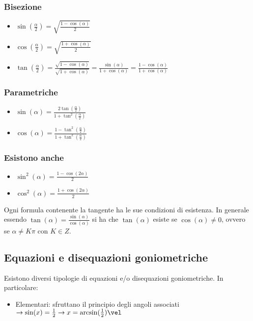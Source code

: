 \subsubsection*{Bisezione}

\begin{itemize}
    \item $\sin(\frac{\alpha}{2})=\sqrt{\frac{1-\cos(\alpha)}{2}}$
    \item $\cos(\frac{\alpha}{2})=\sqrt{\frac{1+\cos(\alpha)}{2}}$
    \item $\tan(\frac{\alpha}{2})=\frac{\sqrt{1-\cos(\alpha)}}{\sqrt{1+\cos(\alpha)}}=\frac{\sin(\alpha)}{1+\cos(\alpha)}=\frac{1-\cos(\alpha)}{1+\cos(\alpha)}$
\end{itemize}

\subsubsection*{Parametriche}

\begin{itemize}
    \item $\sin(\alpha)=\frac{2\tan(\frac{\alpha}{2})}{1+\tan^2(\frac{\alpha}{2})}$
    \item $\cos(\alpha)=\frac{1-\tan^2(\frac{\alpha}{2})}{1+\tan^2(\frac{\alpha}{2})}$
\end{itemize}

\subsubsection*{Esistono anche}

\begin{itemize}
    \item $\sin^2(\alpha)=\frac{1-\cos(2\alpha)}{2}$
    \item $\cos^2(\alpha)=\frac{1+\cos(2\alpha)}{2}$
\end{itemize}

Ogni formula contenente la tangente ha le sue condizioni di esistenza.
In generale essendo $\tan(\alpha)=\frac{\sin(\alpha)}{\cos(\alpha)}$ si ha che $\tan(\alpha)$ esiste se $\cos(\alpha)\neq0$, ovvero se $\alpha\neq K\pi$ con $K \in Z$.


\subsection{Equazioni e disequazioni goniometriche}

Esistono diversi tipologie di equazioni e/o disequazioni goniometriche. In particolare:

\begin{itemize}
    \item Elementari: sfruttano il principio degli angoli associati $\rightarrow \sin(x) = \frac{1}{2} \rightarrow x = \arcsin(\frac{1}{2}) \vel $
\end{itemize}